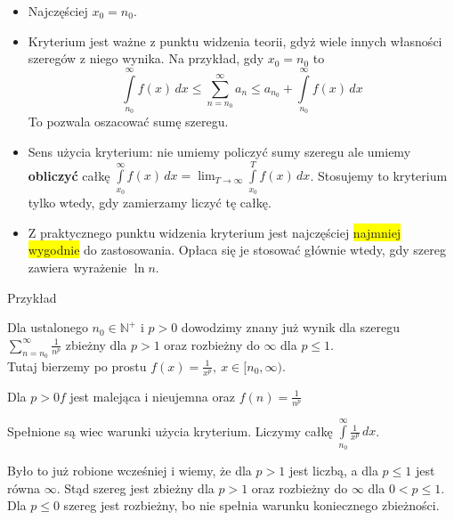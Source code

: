 \begin{itemize}
    \item Najczęściej $ x_0 = n_0 $.
    \item Kryterium jest ważne z punktu widzenia teorii, gdyż wiele innych własności szeregów z niego wynika.
    Na przykład, gdy $x_0 = n_0$ to
    $$ \int\limits_{n_0}^{\infty} f(x) \,dx \leq \sum\limits_{n = n_0}^{\infty} a_n \leq 
    a_{n_0} + \int\limits_{n_0}^{\infty} f(x) \,dx $$
    To pozwala oszacować sumę szeregu.

    \item Sens użycia kryterium: nie umiemy policzyć sumy szeregu ale umiemy \textbf{obliczyć} całkę
    $ \int\limits_{x_0}^{\infty} f(x) \,dx = \lim_{T \to \infty} \int\limits_{x_0}^{T} f(x) \,dx $. Stosujemy to
    kryterium tylko wtedy, gdy zamierzamy liczyć tę całkę.

    \item Z praktycznego punktu widzenia kryterium jest najczęściej \colorbox{yellow}{najmniej wygodnie} do zastosowania.
    Opłaca się je stosować głównie wtedy, gdy szereg zawiera wyrażenie $\ln n$. \\
\end{itemize}

Przykład

Dla ustalonego $ n_0 \in \mathbb{N}^+ $ i $p > 0$ dowodzimy znany już wynik dla szeregu $ \sum\limits_{n = n_0}^{\infty} \frac{1}{n^p} $
zbieżny dla $p > 1$ oraz rozbieżny do $\infty$ dla $p \leq 1$. \\

Tutaj bierzemy po prostu $ f(x) = \frac{1}{x^p}, \ x \in [n_0, \infty) $.

Dla $p > 0 f$ jest malejąca i nieujemna oraz $ f(n) = \frac{1}{n^p} $ 

Spełnione są wiec warunki użycia kryterium. Liczymy całkę $ \int\limits_{n_0}^{\infty} \frac{1}{x^p} \,dx $.

Było to już robione wcześniej i wiemy, że dla $p > 1$ jest liczbą, a dla $p \leq 1$ jest równa $\infty$.
Stąd szereg jest zbieżny dla $p > 1$ oraz rozbieżny do $\infty$ dla $0 < p \leq 1$. Dla $p \leq 0$ szereg jest rozbieżny,
bo nie spełnia warunku koniecznego zbieżności.